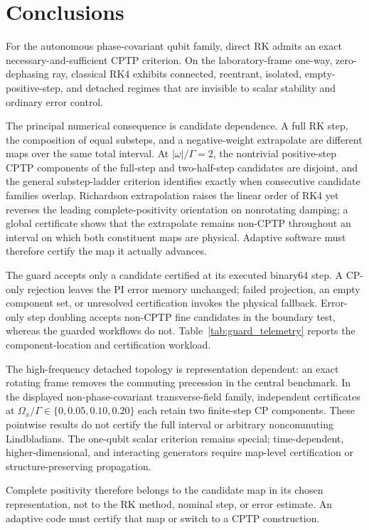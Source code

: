 \section{Conclusions}
\label{sec:conclusion}

For the autonomous phase-covariant qubit family, direct RK admits an exact necessary-and-sufficient CPTP criterion. On the laboratory-frame one-way, zero-dephasing ray, classical RK4 exhibits connected, reentrant, isolated, empty-positive-step, and detached regimes that are invisible to scalar stability and ordinary error control.

The principal numerical consequence is candidate dependence. A full RK step, the composition of equal substeps, and a negative-weight extrapolate are different maps over the same total interval. At $|\omega|/\Gamma=2$, the nontrivial positive-step CPTP components of the full-step and two-half-step candidates are disjoint, and the general substep-ladder criterion identifies exactly when consecutive candidate families overlap. Richardson extrapolation raises the linear order of RK4 yet reverses the leading complete-positivity orientation on nonrotating damping; a global certificate shows that the extrapolate remains non-CPTP throughout an interval on which both constituent maps are physical. Adaptive software must therefore certify the map it actually advances.

The guard accepts only a candidate certified at its executed binary64 step. A CP-only rejection leaves the PI error memory unchanged; failed projection, an empty component set, or unresolved certification invokes the physical fallback. Error-only step doubling accepts non-CPTP fine candidates in the boundary test, whereas the guarded workflows do not. Table~\ref{tab:guard_telemetry} reports the component-location and certification workload.

The high-frequency detached topology is representation dependent: an exact rotating frame removes the commuting precession in the central benchmark. In the displayed non-phase-covariant transverse-field family, independent certificates at $\Omega_x/\Gamma\in\{0,0.05,0.10,0.20\}$ each retain two finite-step CP components. These pointwise results do not certify the full interval or arbitrary noncommuting Lindbladians. The one-qubit scalar criterion remains special; time-dependent, higher-dimensional, and interacting generators require map-level certification or structure-preserving propagation.

Complete positivity therefore belongs to the candidate map in its chosen representation, not to the RK method, nominal step, or error estimate. An adaptive code must certify that map or switch to a CPTP construction.
